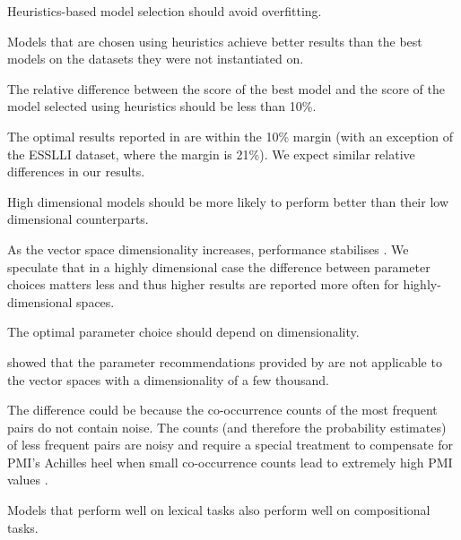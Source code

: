 \begin{hyp}
\label{hyp:overfitting}
Heuristics-based model selection should avoid overfitting.
\end{hyp}

Models that are chosen using heuristics achieve better results than the best models on the datasets they were not instantiated on.

\begin{hyp}
\label{hyp:10percent}
The relative difference between the score of the best model and the score of the model selected using heuristics should be less than 10\%.
\end{hyp}

The optimal results reported in  are within the 10\% margin (with an exception of the ESSLLI dataset, where the margin is 21\%). We expect similar relative differences in our results.

\begin{hyp}
\label{hyp:var}
High dimensional models should be more likely to perform better than their low dimensional counterparts.
\end{hyp}

As the vector space dimensionality increases, performance stabilises \cite{kiela-clark:2014:CVSC,BullinariaLevy2012,lapesa2014large}. We speculate that in a highly dimensional case the difference between parameter choices matters less and thus higher results are reported more often for highly-dimensional spaces.

\begin{hyp}
\label{hyp:dimen}
The optimal parameter choice should depend on dimensionality.
\end{hyp}

 showed that the parameter recommendations provided by  are not applicable to the vector spaces with a dimensionality of a few thousand.

The difference could be because the co-occurrence counts of the most frequent pairs do not contain noise. The counts (and therefore the probability estimates) of less frequent pairs are noisy and require a special treatment to compensate for PMI's Achilles heel when small co-occurrence counts lead to extremely high PMI values \cite{TACL570}.

\begin{hyp}
\label{hyp:not-lextocomp}
Models that perform well on lexical tasks also perform well on compositional tasks.
\end{hyp}

